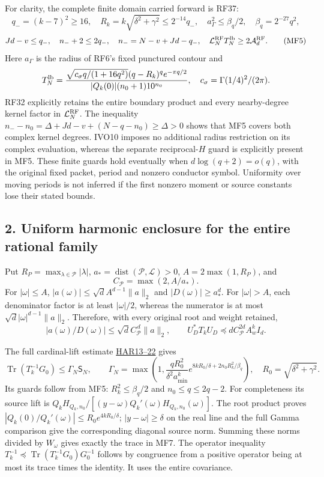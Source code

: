 \documentclass[11pt]{article}
\begin{document}
For clarity, the complete finite domain carried forward is RF37: \[
q_-=(k-7)^2\ge16,\quad R_k=k\sqrt{\delta^2+\gamma^2}\le2^{-14}q_-,
\quad a_\Gamma^2\le\beta_q/2,\quad\beta_q=2^{-27}q^2,
\] \[
Jd-v\le q_-,\quad n_-+2\le2q_-,\quad
n_-=N-v+Jd-q_-,\quad
\mathcal L_N^{\rm RF}T_N^{\rm lb}\ge2\mathcal A_d^{\rm RF}.
\tag{MF5}
\] Here \(a_\Gamma\) is the radius of RF6's fixed punctured contour and \[
T_N^{\rm lb}=
\frac{\sqrt{c_\sigma q/(1+16q^2)}(q-R_k)^q e^{-\pi q/2}}
 {|Q_k(0)|(n_0+1)10^{n_0}},
\quad c_\sigma=\Gamma(1/4)^2/(2\pi).
\] RF32 explicitly retains the entire boundary product and every nearby-degree kernel factor in \(\mathcal L_N^{\rm RF}\). The inequality \(n_--n_0=\Delta+Jd-v+(N-q-n_0)\ge\Delta>0\) shows that MF5 covers both complex kernel degrees. IVO10 imposes no additional radius restriction on its complex evaluation, whereas the separate reciprocal-\(H\) guard is explicitly present in MF5. These finite guards hold eventually when \(d\log(q+2)=o(q)\), with the original fixed packet, period and nonzero conductor symbol. Uniformity over moving periods is not inferred if the first nonzero moment or source constants lose their stated bounds.

\subsection{2. Uniform harmonic enclosure for the entire rational family}\label{uniform-harmonic-enclosure-for-the-entire-rational-family}

Put \(R_P=\max_{\lambda\in\mathscr P}|\lambda|\), \(a_*=\operatorname{dist}(\mathscr P,\mathscr L)>0\), \(A=2\max(1,R_P)\), and \[
C_{\mathscr P}=\max(2,A/a_*).
\] For \(|\omega|\le A\), \(|a(\omega)|\le\sqrt d A^{d-1}\|a\|_2\) and \(|D(\omega)|\ge a_*^d\). For \(|\omega|>A\), each denominator factor is at least \(|\omega|/2\), whereas the numerator is at most \(\sqrt d|\omega|^{d-1}\|a\|_2\). Therefore, with every original root and weight retained, \[
|a(\omega)/D(\omega)|\le\sqrt d C_{\mathscr P}^{\,d}\|a\|_2,\qquad
U_D^*T_kU_D\preceq d C_{\mathscr P}^{2d}A_w^k I_d.
\tag{MF6}
\]

The full cardinal-lift estimate \href{https://github.com/KokunoYumeto/zeta-function-research-reader/blob/360d3c1d798da434966d35f7e407fc59c14f234b/workbenches/splitzero-tandem/continuations/20260921-critical-inverse-activation/HARMONIC_PROOFS.md\#L134}{HAR13--22} gives \[
\operatorname{Tr}(T_k^{-1}G_0)\le\Gamma_N\mathsf S_N,\qquad
\Gamma_N=\max\left(1,\frac{qR_0^2}{\delta^2a_{\min}^k}
e^{8kR_0/\delta+2n_0R_k^2/\beta_q}\right),\quad R_0=\sqrt{\delta^2+\gamma^2}.
\tag{MF7}
\] Its guards follow from MF5: \(R_k^2\le\beta_q/2\) and \(n_0\le q\le2q-2\). For completeness its source lift is \(Q_kH_{Q_k,n_0}/[(y-\omega)Q_k'(\omega)H_{Q_k,n_0}(\omega)]\). The root product proves \(|Q_k(0)/Q_k'(\omega)|\le R_0e^{4kR_0/\delta}\); \(|y-\omega|\ge\delta\) on the real line and the full Gamma comparison give the corresponding diagonal source norm. Summing these norms divided by \(W_\omega\) gives exactly the trace in MF7. The operator inequality \(T_k^{-1}\preceq\operatorname{Tr}(T_k^{-1}G_0)G_0^{-1}\) follows by congruence from a positive operator being at most its trace times the identity. It uses the entire covariance.
\end{document}
